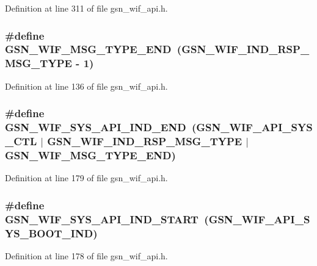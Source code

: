 Definition at line 311 of file gsn\_\-wif\_\-api.h.

\hypertarget{a00606_aa998987ec74a3be76345057ed66ca72c}{
\subsubsection[{GSN\_\-WIF\_\-MSG\_\-TYPE\_\-END}]{\setlength{\rightskip}{0pt plus 5cm}\#define GSN\_\-WIF\_\-MSG\_\-TYPE\_\-END~(GSN\_\-WIF\_\-IND\_\-RSP\_\-MSG\_\-TYPE -\/ 1)}}
\label{a00606_aa998987ec74a3be76345057ed66ca72c}


Definition at line 136 of file gsn\_\-wif\_\-api.h.

\hypertarget{a00606_a4b084ace5b4394d9dfbd5f15515942ba}{
\subsubsection[{GSN\_\-WIF\_\-SYS\_\-API\_\-IND\_\-END}]{\setlength{\rightskip}{0pt plus 5cm}\#define GSN\_\-WIF\_\-SYS\_\-API\_\-IND\_\-END~(GSN\_\-WIF\_\-API\_\-SYS\_\-CTL $|$ GSN\_\-WIF\_\-IND\_\-RSP\_\-MSG\_\-TYPE $|$ GSN\_\-WIF\_\-MSG\_\-TYPE\_\-END)}}
\label{a00606_a4b084ace5b4394d9dfbd5f15515942ba}


Definition at line 179 of file gsn\_\-wif\_\-api.h.

\hypertarget{a00606_a4dfac5bd144fa9e23e0389182df89716}{
\subsubsection[{GSN\_\-WIF\_\-SYS\_\-API\_\-IND\_\-START}]{\setlength{\rightskip}{0pt plus 5cm}\#define GSN\_\-WIF\_\-SYS\_\-API\_\-IND\_\-START~(GSN\_\-WIF\_\-API\_\-SYS\_\-BOOT\_\-IND)}}
\label{a00606_a4dfac5bd144fa9e23e0389182df89716}


Definition at line 178 of file gsn\_\-wif\_\-api.h.

